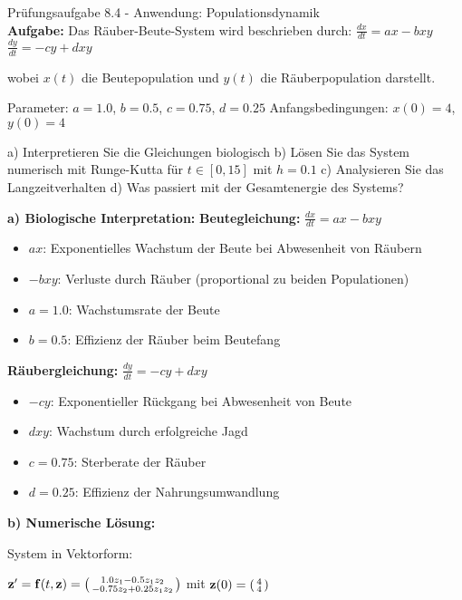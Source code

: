\begin{example2}{Prüfungsaufgabe 8.4 - Anwendung: Populationsdynamik}\\
\textbf{Aufgabe:} Das Räuber-Beute-System wird beschrieben durch:
$\frac{dx}{dt} = ax - bxy$
$\frac{dy}{dt} = -cy + dxy$

wobei $x(t)$ die Beutepopulation und $y(t)$ die Räuberpopulation darstellt.

Parameter: $a = 1.0$, $b = 0.5$, $c = 0.75$, $d = 0.25$
Anfangsbedingungen: $x(0) = 4$, $y(0) = 4$

a) Interpretieren Sie die Gleichungen biologisch
b) Lösen Sie das System numerisch mit Runge-Kutta für $t \in [0, 15]$ mit $h = 0.1$
c) Analysieren Sie das Langzeitverhalten
d) Was passiert mit der Gesamtenergie des Systems?
\tcblower

\textbf{a) Biologische Interpretation:}
\textbf{Beutegleichung:} $\frac{dx}{dt} = ax - bxy$
\begin{itemize}
    \item $ax$: Exponentielles Wachstum der Beute bei Abwesenheit von Räubern
    \item $-bxy$: Verluste durch Räuber (proportional zu beiden Populationen)
    \item $a = 1.0$: Wachstumsrate der Beute
    \item $b = 0.5$: Effizienz der Räuber beim Beutefang
\end{itemize}

\textbf{Räubergleichung:} $\frac{dy}{dt} = -cy + dxy$
\begin{itemize}
    \item $-cy$: Exponentieller Rückgang bei Abwesenheit von Beute
    \item $dxy$: Wachstum durch erfolgreiche Jagd
    \item $c = 0.75$: Sterberate der Räuber
    \item $d = 0.25$: Effizienz der Nahrungsumwandlung
\end{itemize}

\textbf{b) Numerische Lösung:}

System in Vektorform:

$\mathbf{z}' = \mathbf{f}(t, \mathbf{z}) = \begin{psmallmatrix}
1.0 z_1 - 0.5 z_1 z_2 \\
-0.75 z_2 + 0.25 z_1 z_2
\end{psmallmatrix}$
mit $\mathbf{z}(0) = \begin{psmallmatrix} 4 \\ 4 \end{psmallmatrix}$


\end{example2}
